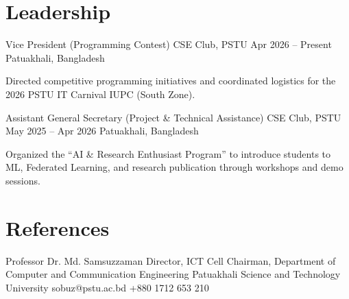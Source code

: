 \documentclass[11pt, a4paper]{article}
\begin{document}
\section{Leadership}
\cvExperience
    {Vice President (Programming Contest)}
    {CSE Club, PSTU}
    {Apr 2026 -- Present}
    {Patuakhali, Bangladesh}
    {
        \item Directed competitive programming initiatives and coordinated logistics for the 2026 PSTU IT Carnival IUPC (South Zone).
    }

\cvExperience
    {Assistant General Secretary (Project \& Technical Assistance)}
    {CSE Club, PSTU}
    {May 2025 -- Apr 2026}
    {Patuakhali, Bangladesh}
    {
        \item Organized the ``AI \& Research Enthusiast Program'' to introduce students to ML, Federated Learning, and research publication through workshops and demo sessions.
    }


\section{References}
\cvReference
    {Professor Dr. Md. Samsuzzaman}
    {Director, ICT Cell}
    {Chairman, Department of Computer and Communication Engineering}
    {Patuakhali Science and Technology University}
    {sobuz@pstu.ac.bd}
    {+880 1712 653 210}
\end{document}
